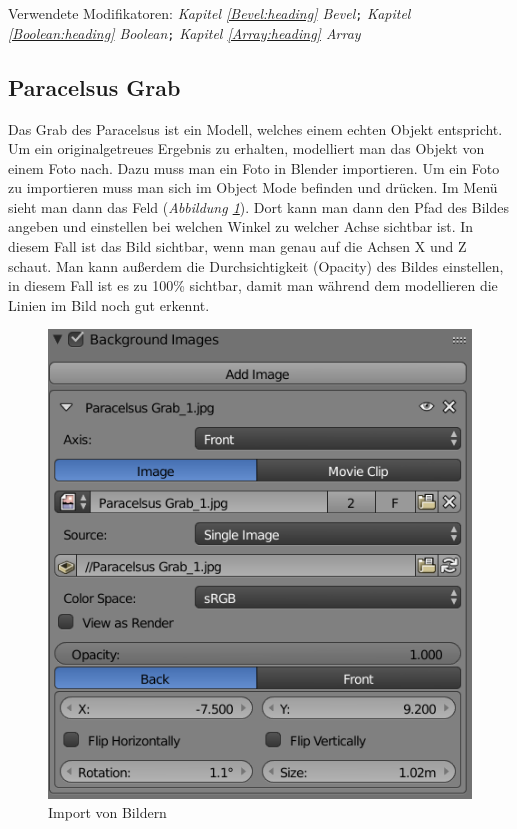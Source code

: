 Verwendete Modifikatoren: \textit{Kapitel \ref{Bevel:heading} \dq Bevel\dq}\verb+;+ \textit{Kapitel \ref{Boolean:heading} \dq Boolean\dq}\verb+;+ \textit{Kapitel \ref{Array:heading} \dq Array\dq}

\subsection{Paracelsus Grab}
\label{paracelsusgrab:ref1}
Das Grab des Paracelsus ist ein Modell, welches einem echten Objekt entspricht. Um ein originalgetreues Ergebnis zu erhalten,
modelliert man das Objekt von einem Foto nach. Dazu muss man ein Foto in Blender importieren. Um ein Foto zu importieren muss man sich im Object Mode befinden und 
drücken. Im Menü sieht man dann das Feld  (\textit{Abbildung \ref{Paracelsus_Grab:image1}}). Dort kann man dann den Pfad des Bildes angeben
und einstellen bei welchen Winkel zu welcher Achse sichtbar ist. In diesem Fall ist das Bild sichtbar, wenn man genau auf die Achsen X und Z schaut. Man kann außerdem die
Durchsichtigkeit (Opacity) des Bildes einstellen, in diesem Fall ist es zu 100\% sichtbar, damit man während dem modellieren die Linien im Bild noch gut erkennt.

\raggedbottom
\begin{figure}[H]
    \centering
    \includegraphics[width=.8\textwidth]{images/Paracelsus-Grab_Import-von-Bildern.png}
    \caption{Import von Bildern}
    \label{Paracelsus_Grab:image1}
\end{figure}

